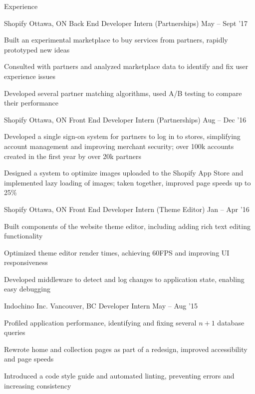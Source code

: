 \documentclass{resume} %
\begin{document}
\begin{rSection}{Experience}
  \begin{rSubsection}{Shopify}
                     {Ottawa, ON}
                     {Back End Developer Intern (Partnerships)}
                     {May -- Sept '17}
    \item Built an experimental marketplace to buy services from partners, rapidly prototyped new ideas
    \item Consulted with partners and analyzed marketplace data to identify and fix user experience issues
    \item Developed several partner matching algorithms, used A/B testing to compare their performance
  \end{rSubsection}

  \begin{rSubsection}{Shopify}
                     {Ottawa, ON}
                     {Front End Developer Intern (Partnerships)}
                     {Aug -- Dec '16}
    \item Developed a single sign-on system for partners to log in to stores, simplifying account management and improving merchant security; over 100k accounts created in the first year by over 20k partners
    \item Designed a system to optimize images uploaded to the Shopify App Store and implemented lazy loading of images; taken together, improved page speeds up to 25\%
  \end{rSubsection}

  \begin{rSubsection}{Shopify}
                     {Ottawa, ON}
                     {Front End Developer Intern (Theme Editor)}
                     {Jan -- Apr '16}
    \item Built components of the website theme editor, including adding rich text editing functionality
    \item Optimized theme editor render times, achieving 60FPS and improving UI responsiveness
    \item Developed middleware to detect and log changes to application state, enabling easy debugging
  \end{rSubsection}

  \begin{rSubsection}{Indochino Inc.}
                     {Vancouver, BC}
                     {Developer Intern}
                     {May -- Aug '15}
    \item Profiled application performance, identifying and fixing several $n+1$ database queries
    \item Rewrote home and collection pages as part of a redesign, improved accessibility and page speeds
    \item Introduced a code style guide and automated linting, preventing errors and increasing consistency
  \end{rSubsection}


\end{rSection}
\end{document}
